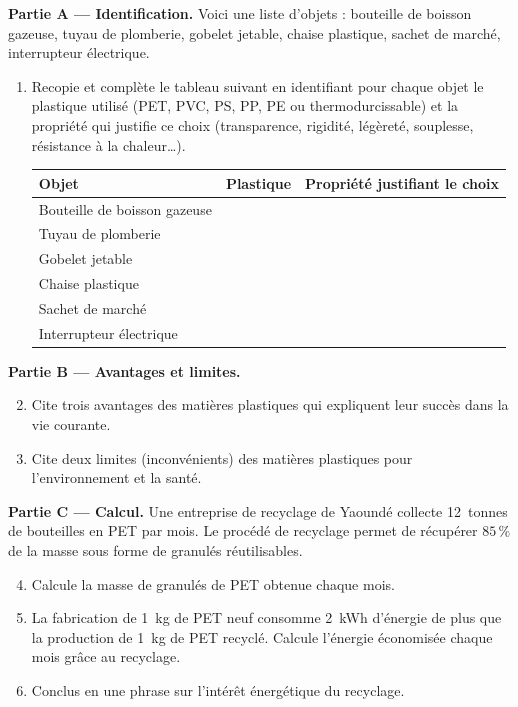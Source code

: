 \documentclass[11pt]{article}
\begin{document}
\begin{exercice}
\textbf{Partie A — Identification.} Voici une liste d'objets : bouteille de boisson gazeuse, tuyau de plomberie, gobelet jetable, chaise plastique, sachet de marché, interrupteur électrique.
\begin{enumerate}
\item Recopie et complète le tableau suivant en identifiant pour chaque objet le plastique utilisé (PET, PVC, PS, PP, PE ou thermodurcissable) et la propriété qui justifie ce choix (transparence, rigidité, légèreté, souplesse, résistance à la chaleur\ldots).

\begin{center}
\begin{tabularx}{\linewidth}{|l|X|X|}
\hline
\rowcolor{popblueL} \textbf{Objet} & \textbf{Plastique} & \textbf{Propriété justifiant le choix} \\
\hline
Bouteille de boisson gazeuse & & \\
\hline
Tuyau de plomberie & & \\
\hline
Gobelet jetable & & \\
\hline
Chaise plastique & & \\
\hline
Sachet de marché & & \\
\hline
Interrupteur électrique & & \\
\hline
\end{tabularx}
\end{center}
\end{enumerate}
\textbf{Partie B — Avantages et limites.}
\begin{enumerate}
\setcounter{enumi}{1}
\item Cite trois avantages des matières plastiques qui expliquent leur succès dans la vie courante.
\item Cite deux limites (inconvénients) des matières plastiques pour l'environnement et la santé.
\end{enumerate}
\textbf{Partie C — Calcul.} Une entreprise de recyclage de Yaoundé collecte \SI{12}{tonnes} de bouteilles en PET par mois. Le procédé de recyclage permet de récupérer $85\,\%$ de la masse sous forme de granulés réutilisables.
\begin{enumerate}
\setcounter{enumi}{3}
\item Calcule la masse de granulés de PET obtenue chaque mois.
\item La fabrication de \SI{1}{kg} de PET neuf consomme \SI{2}{kWh} d'énergie de plus que la production de \SI{1}{kg} de PET recyclé. Calcule l'énergie économisée chaque mois grâce au recyclage.
\item Conclus en une phrase sur l'intérêt énergétique du recyclage.
\end{enumerate}
\end{exercice}
\end{document}
